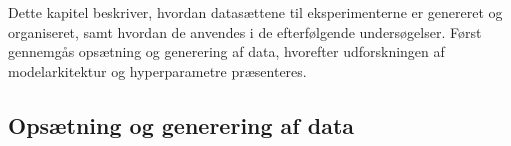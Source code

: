 
Dette kapitel beskriver, hvordan datasættene til eksperimenterne er genereret og organiseret, samt hvordan de anvendes i de efterfølgende undersøgelser.
Først gennemgås opsætning og generering af data, hvorefter udforskningen af modelarkitektur og hyperparametre præsenteres.

\subsection{Opsætning og generering af data}\label{ch4_1}



